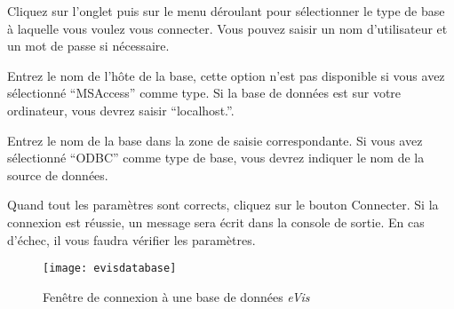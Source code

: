 \label{evis_connect_database}


Cliquez sur l'onglet  puis sur le menu déroulant  pour sélectionner le type de base à laquelle vous voulez vous connecter. Vous pouvez saisir un nom d'utilisateur et un mot de passe si nécessaire.


Entrez le nom de l'hôte de la base, cette option n'est pas disponible si vous avez sélectionné ``MSAccess'' comme type. Si la base de données est sur votre ordinateur, vous devrez saisir ``localhost.''.


Entrez le nom de la base dans la zone de saisie correspondante. Si vous avez sélectionné ``ODBC'' comme type de base, vous devrez indiquer le nom de la source de données.


Quand tout les paramètres sont corrects, cliquez sur le bouton Connecter. Si la connexion est réussie, un message sera écrit dans la console de sortie. En cas d'échec, il vous faudra vérifier les paramètres.

\begin{figure}[ht]
   \begin{center}
\caption{\label{evisdatabase}Fenêtre de connexion à une base de données \emph{eVis} \nixcaption}
\texttt{[image: evisdatabase]}
\end{center}
\end{figure}

